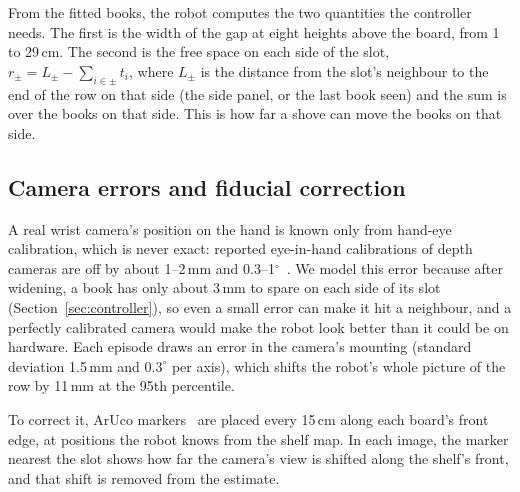 \documentclass{article}
\begin{document}
From the fitted books, the robot computes the two quantities the controller needs. The first is the width
of the gap at eight heights above the board, from 1 to 29\,cm. The second is the free space on each side
of the slot, $r_\pm = L_\pm - \sum_{i \in \pm} t_i$, where $L_\pm$ is the distance from the slot's neighbour
to the end of the row on that side (the side panel, or the last book seen) and the sum is over the books
on that side. This is how far a shove can move the books on that side.

\subsection{Camera errors and fiducial correction}
A real wrist camera's position on the hand is known only from hand-eye calibration, which is never exact:
reported eye-in-hand calibrations of depth cameras are off by about 1--2\,mm and 0.3--1$^\circ$~\citep{li2024handeye}. We model
this error because after widening, a book has only about 3\,mm to spare on each side of its slot
(Section~\ref{sec:controller}), so even a small error can make it hit a neighbour, and a perfectly calibrated camera would make the robot look
better than it could be on hardware. Each episode draws an error in the camera's mounting (standard
deviation 1.5\,mm and $0.3^\circ$ per axis), which shifts the robot's whole picture of the row by
11\,mm at the 95th percentile.

To correct it, ArUco markers~\citep{garrido2014aruco} are placed every 15\,cm along each board's front
edge, at positions the robot knows from the shelf map. In each image, the marker nearest the slot shows
how far the camera's view is shifted along the shelf's front, and that shift is removed from the estimate.
\end{document}
